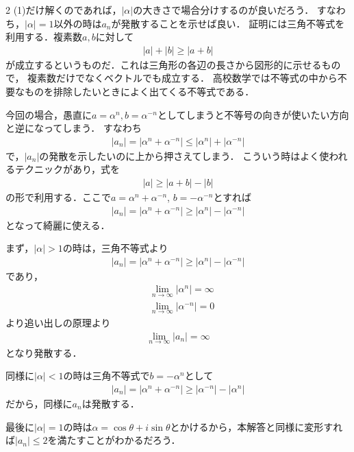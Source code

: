 \documentclass[../../main.tex]{subfiles}
\begin{document}
\begin{multicols}{2}
  (1)だけ解くのであれば，$|\alpha|$の大きさで場合分けするのが良いだろう．
  すなわち，$|\alpha|=1$以外の時は$a_n$が発散することを示せば良い．
  証明には三角不等式を利用する．複素数$a,b$に対して
  \begin{align}
    |a| + |b| \ge |a+b|
  \end{align}
  が成立するというものだ．これは三角形の各辺の長さから図形的に示せるもので，
  複素数だけでなくベクトルでも成立する．
  高校数学では不等式の中から不要なものを排除したいときによく出てくる不等式である．

  今回の場合，愚直に$a=\alpha^n,b=\alpha^{-n}$としてしまうと不等号の向きが使いたい方向と逆になってしまう．
  すなわち
  \begin{align}
    |a_n| = \left|\alpha^n+\alpha^{-n}\right| \le \left|\alpha^n\right| + \left|\alpha^{-n}\right|
  \end{align}
  で，$|a_n|$の発散を示したいのに上から押さえてしまう．
  こういう時はよく使われるテクニックがあり，式を
  \begin{align}
    |a| \ge |a+b| - |b|
  \end{align}
  の形で利用する．ここで$a=\alpha^n+\alpha^{-n}$, $b=-\alpha^{-n}$とすれば
  \begin{align}
    |a_n| = \left|\alpha^n+\alpha^{-n}\right| \ge \left|\alpha^n\right| - \left|\alpha^{-n}\right|
  \end{align}
  となって綺麗に使える．

  まず，$|\alpha|>1$の時は，三角不等式より
  \begin{align}
    |a_n| = |\alpha^n+\alpha^{-n}| \ge \left|\alpha^n\right| - \left|\alpha^{-n}\right|
  \end{align}
  であり，
  \begin{align}
    & \lim_{n\to\infty} \left|\alpha^n\right| = \infty \\
    & \lim_{n\to\infty} \left|\alpha^{-n}\right| = 0
  \end{align}
  より追い出しの原理より
  \begin{align}
    \lim_{n\to\infty} |a_n| = \infty
  \end{align}
  となり発散する．

  同様に$|\alpha|<1$の時は三角不等式で$b=-\alpha^{n}$として
  \begin{align}
    |a_n| = |\alpha^n+\alpha^{-n}| \ge \left|\alpha^{-n}\right| - \left|\alpha^{n}\right|
  \end{align}
  だから，同様に$a_n$は発散する．

  最後に$|\alpha|=1$の時は$\alpha=\cos\theta+i\sin\theta$とかけるから，本解答と同様に変形すれば$|a_n|\le 2$を満たすことがわかるだろう．
  \newpage
\end{multicols}
\end{document}
